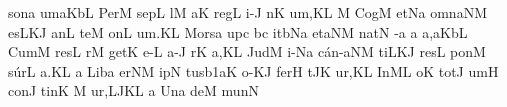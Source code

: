 \spatium
\sgn son\punctum a\egn
\sgn {}um\clivis aK\augmentumduplex bL\egn
\spatium
\divisiominor
\spatium
\sgn Per\punctum M\egn
\spatium
\sgn sep\punctum L\egn
{}l\punctum M\egn
{}a{}\punctum K\egn
\spatium
\sgn reg\punctum L\egn
\sgn {}i-\punctum J\egn
{}n\punctum K\egn
\sgn {}u{m,}\punctum K\augmentum L\egn
\spatium
\divisiominor
\spatium
\custos M
\lineaproxima
\sgn Cog\punctum M\egn
\sgn {}et\pes Na\egn
\spatium
\sgn {}o{mn}\climacus aNM\egn
\sgn {}es\climacus LKJ\egn
\spatium
\sgn {}an\punctum L\egn
\sgn te{}\punctum M\egn
\spatium
{}on\punctum L\egn
\sgn {}u{m.}\punctum K\augmentum L\egn
\spatium
\divisiofinalis
\spatium
\sgn Mo{rs}\punctum a\egn
\spatium
{}up\punctum c\egn
{}b\punctum c\egn
\sgn {}it\porrectus bNa\egn
\spatium
\sgn {}et\climacus aNM\egn
\spatium
\sgn nat\punctum N\egn
{}-\punctum a\egn
\custos a
\lineaproxima
\sgn {}a,\clivis aK\augmentumduplex bL\egn
\spatium
\divisiominor
\spatium
\sgn Cum\punctum M\egn
\spatium
\sgn res\punctum L\egn
{}r\punctum M\egn
\sgn get\punctum K\egn
\spatium
{}e-\punctum L\egn
\sgn {}a-\punctum J\egn
{}r\punctum K\egn
\sgn {}a{,}\punctum K\augmentum L\egn
\spatium
\divisiominor
\spatium
\sgn Jud\punctum M\egn
\sgn {}i-\pes Na\egn
\sgn c{\'a}{n-}\climacus aNM\egn
\sgn ti{}\climacus LKJ\egn
\spatium
\sgn res\punctum L\egn
\sgn pon\punctum M\egn
\sgn s{\'u}r\punctum L\egn
\sgn {}a{.}\punctum K\augmentum L\egn
\spatium
\divisiofinalis
\spatium
\custos a
\Internote
\lineaproxima
\sgn Lib\punctum a\egn
\sgn {}er\clivis NM\egn
\spatium
{}ip\punctum N\egn
\sgn tus\episem b1\clivis aK\egn
\spatium
{}o-\clivis KJ\egn
\sgn fer\punctum H\egn
{}t\pes JK\egn
\sgn {}u{r,}\punctum K\augmentum L\egn
\spatium
\divisiominor
\spatium
\sgn {}In\clivis ML\egn
\spatium
{}o{}\punctum K\egn
\spatium
\sgn t{o}t\punctum J\egn
\sgn {}um\punctum H\egn
\spatium
\sgn con\punctum J\egn
\sgn tin\punctum K\egn
{}\punctum M\egn
\sgn {}u{r,}\porrectus LJK\augmentum L\egn
\spatium
\divisiominor
\spatium
\custos a
\lineaproxima
\sgn {}Un\punctum a\egn
\sgn de{}\punctum M\egn
\spatium
\sgn mun\punctum N\egn
